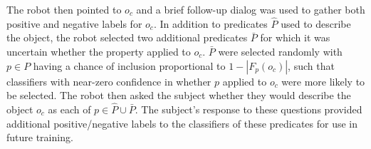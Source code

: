 The robot then pointed to $o_c$ and a brief follow-up dialog was used to gather both positive and negative labels for $o_c$.
In addition to predicates $\hat{P}$ used to describe the object, the robot selected two additional predicates $\bar{P}$ for which it was uncertain whether the property applied to $o_c$.
$\bar{P}$ were selected randomly with $p\in P$ having a chance of inclusion proportional to $1-|F_p(o_c)|$, such that classifiers with near-zero confidence in whether $p$ applied to $o_c$ were more likely to be selected.
The robot then asked the subject whether they would describe the object $o_c$ as each of $p\in\hat{P}\cup\bar{P}$.
The subject's response to these questions provided additional positive/negative labels to the classifiers of these predicates for use in future training.